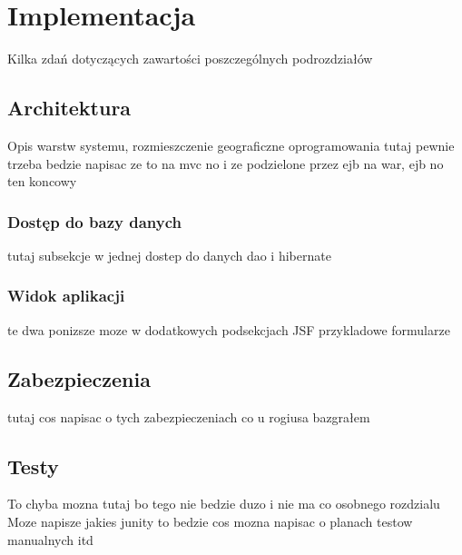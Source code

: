 \chapter{Implementacja}
\label{cha:implementacja}
Kilka zdań dotyczących zawartości
poszczególnych podrozdziałów 

\section{Architektura}
Opis warstw systemu, rozmieszczenie
geograficzne oprogramowania \newline
tutaj pewnie trzeba bedzie napisac ze to na mvc \newline
no i ze podzielone przez ejb na war, ejb no ten koncowy\newline
\subsection{Dostęp do bazy danych}
tutaj subsekcje w jednej dostep do danych dao i hibernate \newline
\subsection{Widok aplikacji}
te dwa ponizsze moze w dodatkowych podsekcjach
JSF \newline
przykladowe formularze
\section{Zabezpieczenia}
tutaj cos napisac o tych zabezpieczeniach co u rogiusa bazgrałem
\section{Testy}
To chyba mozna tutaj bo tego nie bedzie duzo i nie ma co osobnego rozdzialu\newline
Moze napisze jakies junity to bedzie cos\newline
mozna napisac o planach testow manualnych itd\newline
